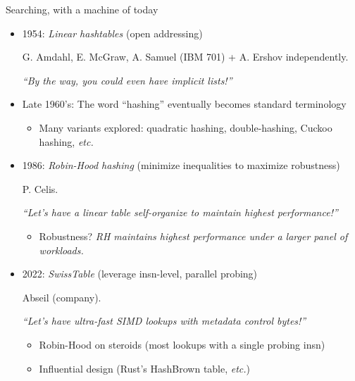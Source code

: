\begin{frame}[fragile]{Searching, with a machine of today}

  \begin{itemize}
  \item 1954: {\em Linear hashtables} (open addressing)

    G. Amdahl, E. McGraw, A. Samuel (IBM 701) + A. Ershov independently.

    {\em ``By the way, you could even have {\em implicit} lists!''}

  \item Late 1960's: The word ``hashing'' eventually becomes standard terminology
    \begin{itemize}
    \item Many variants explored: quadratic hashing, double-hashing, Cuckoo hashing, {\em etc.}
    \end{itemize}

  \item 1986: {\em Robin-Hood hashing} (minimize inequalities to maximize robustness)

    P. Celis.
    
    {\em ``Let's have a linear table {\em self-organize to maintain highest performance}!''}

    \begin{itemize}
    \item Robustness? {\em RH maintains highest performance under a larger panel of workloads.}
    \end{itemize}
    
  \item 2022: {\em SwissTable} (leverage insn-level, parallel probing)

    Abseil (company).
    
    {\em ``Let's have {\em ultra-fast SIMD lookups with metadata} control bytes!''}

    \begin{itemize}
    \item Robin-Hood on steroids (most lookups with a single probing insn)
    \item Influential design (Rust's HashBrown table, {\em etc.})
    \end{itemize}
  \end{itemize}
  
\end{frame}


